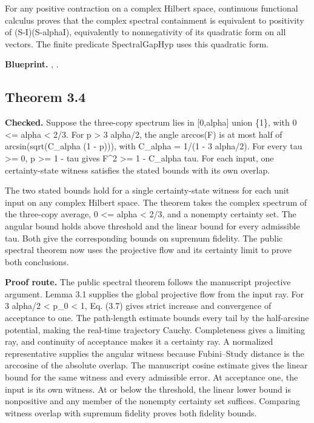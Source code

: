 For any positive contraction on a complex Hilbert space, continuous functional calculus proves that the complex spectral containment is equivalent to positivity of (S-I)(S-alphaI), equivalently to nonnegativity of its quadratic form on all vectors. The finite predicate SpectralGapHyp uses this quadratic form.


\textbf{Blueprint.} , .

\subsection{Theorem 3.4}\label{paper:r3-4}
\textbf{Checked.} Suppose the three-copy spectrum lies in [0,alpha] union \{1\}, with 0 <= alpha < 2/3. For p > 3 alpha/2, the angle arccos(F) is at most half of arcsin(sqrt(C\_alpha (1 - p))), with C\_alpha = 1/(1 - 3 alpha/2). For every tau >= 0, p >= 1 - tau gives F\textasciicircum{}2 >= 1 - C\_alpha tau. For each input, one certainty-state witness satisfies the stated bounds with its own overlap. 

The two stated bounds hold for a single certainty-state witness for each unit input on any complex Hilbert space. The theorem takes the complex spectrum of the three-copy average, 0 <= alpha < 2/3, and a nonempty certainty set. The angular bound holds above threshold and the linear bound for every admissible tau. Both give the corresponding bounds on supremum fidelity. The public spectral theorem now uses the projective flow and its certainty limit to prove both conclusions.

\textbf{Proof route.} The public spectral theorem follows the manuscript projective argument. Lemma 3.1 supplies the global projective flow from the input ray. For 3 alpha/2 < p\_0 < 1, Eq. (3.7) gives strict increase and convergence of acceptance to one. The path-length estimate bounds every tail by the half-arcsine potential, making the real-time trajectory Cauchy. Completeness gives a limiting ray, and continuity of acceptance makes it a certainty ray. A normalized representative supplies the angular witness because Fubini–Study distance is the arccosine of the absolute overlap. The manuscript cosine estimate gives the linear bound for the same witness and every admissible error. At acceptance one, the input is its own witness. At or below the threshold, the linear lower bound is nonpositive and any member of the nonempty certainty set suffices. Comparing witness overlap with supremum fidelity proves both fidelity bounds.

